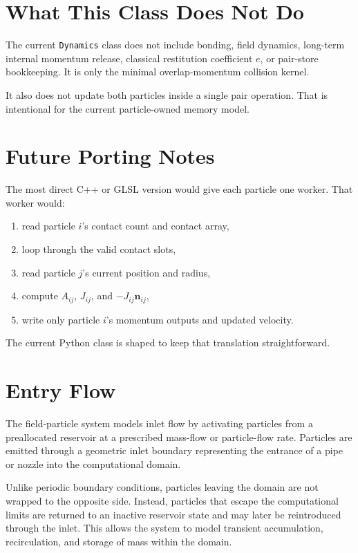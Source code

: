 \documentclass[11pt]{article}
\begin{document}
\section{What This Class Does Not Do}

The current \texttt{Dynamics} class does not include bonding, field dynamics,
long-term internal momentum release, classical restitution coefficient \(e\),
or pair-store bookkeeping. It is only the minimal overlap-momentum collision
kernel.

It also does not update both particles inside a single pair operation. That is
intentional for the current particle-owned memory model.

\section{Future Porting Notes}

The most direct C++ or GLSL version would give each particle one worker. That
worker would:

\begin{enumerate}
    \item read particle \(i\)'s contact count and contact array,
    \item loop through the valid contact slots,
    \item read particle \(j\)'s current position and radius,
    \item compute \(A_{ij}\), \(J_{ij}\), and \(-J_{ij}\mathbf{n}_{ij}\),
    \item write only particle \(i\)'s momentum outputs and updated velocity.
\end{enumerate}

The current Python class is shaped to keep that translation straightforward.
\section{Entry Flow}

The field-particle system models inlet flow by activating particles from a preallocated reservoir at a prescribed mass-flow or particle-flow rate. Particles are emitted through a geometric inlet boundary representing the entrance of a pipe or nozzle into the computational domain.

Unlike periodic boundary conditions, particles leaving the domain are not wrapped to the opposite side. Instead, particles that escape the computational limits are returned to an inactive reservoir state and may later be reintroduced through the inlet. This allows the system to model transient accumulation, recirculation, and storage of mass within the domain.
\end{document}
